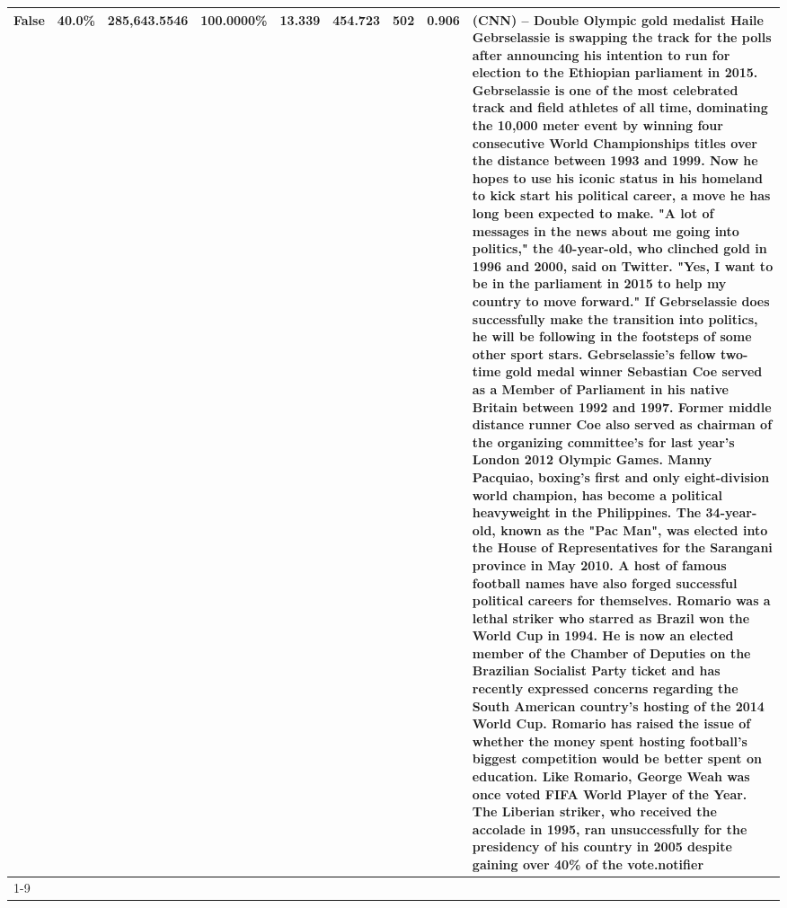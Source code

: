 \begin{table}[H]
{\begin{tabular}{lllrlllll}
False & 40.0\% & 285,643.5546 & \bfseries \color{red} 100.0000\% & 13.339 & 454.723 & 502 & 0.906 & (CNN) -- Double Olympic gold medalist Haile Gebrselassie is swapping the track for the polls after announcing his intention to run for election to the Ethiopian parliament in 2015. Gebrselassie is one of the most celebrated track and field athletes of all time, dominating the 10,000 meter event by winning four consecutive World Championships titles over the distance between 1993 and 1999. Now he hopes to use his iconic status in his homeland to kick start his political career, a move he has long been expected to make. "A lot of messages in the news about me going into politics," the 40-year-old, who clinched gold in 1996 and 2000, said on Twitter. "Yes, I want to be in the parliament in 2015 to help my country to move forward." If Gebrselassie does successfully make the transition into politics, he will be following in the footsteps of some other sport stars. Gebrselassie's fellow two-time gold medal winner Sebastian Coe served as a Member of Parliament in his native Britain between 1992 and 1997. Former middle distance runner Coe also served as chairman of the organizing committee's for last year's London 2012 Olympic Games. Manny Pacquiao, boxing's first and only eight-division world champion, has become a political heavyweight in the Philippines. The 34-year-old, known as the "Pac Man", was elected into the House of Representatives for the Sarangani province in May 2010. A host of famous football names have also forged successful political careers for themselves. Romario was a lethal striker who starred as Brazil won the World Cup in 1994. He is now an elected member of the Chamber of Deputies on the Brazilian Socialist Party ticket and has recently expressed concerns regarding the South American country's hosting of the 2014 World Cup. Romario has raised the issue of whether the money spent hosting football's biggest competition would be better spent on education. Like Romario, George Weah was once voted FIFA World Player of the Year. The Liberian striker, who received the accolade in 1995, ran unsuccessfully for the presidency of his country in 2005 despite gaining over 40\% of the vote.notifier \\
\cline{1-9}

\end{tabular}}
\end{table}
